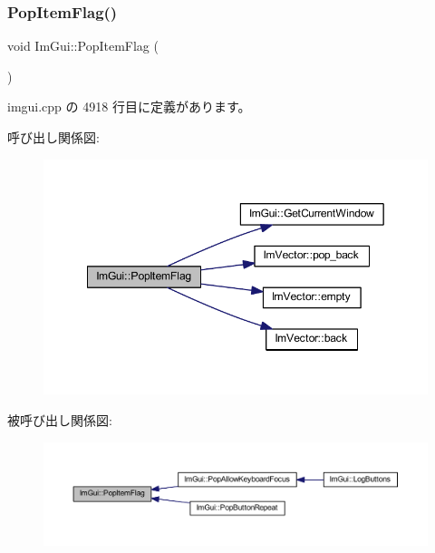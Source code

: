 \subsubsection{\texorpdfstring{Pop\+Item\+Flag()}{PopItemFlag()}}
{\footnotesize\ttfamily void Im\+Gui\+::\+Pop\+Item\+Flag (\begin{DoxyParamCaption}{ }\end{DoxyParamCaption})}



 imgui.\+cpp の 4918 行目に定義があります。

呼び出し関係図\+:\nopagebreak
\begin{figure}[H]
\begin{center}
\leavevmode
\includegraphics[width=349pt]{namespace_im_gui_aa93281155e1dd23715dbd384e91edc6b_cgraph}
\end{center}
\end{figure}
被呼び出し関係図\+:\nopagebreak
\begin{figure}[H]
\begin{center}
\leavevmode
\includegraphics[width=350pt]{namespace_im_gui_aa93281155e1dd23715dbd384e91edc6b_icgraph}
\end{center}
\end{figure}
\mbox{\label{namespace_im_gui_ad29a3fc0cb5dfc7f9fc7224512ce90bf}} 
